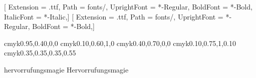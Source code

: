 \usepackage{fontspec}          %
\setmainfont{Inter_24pt}[
  Extension      = .ttf,
  Path           = fonts/,
  UprightFont    = *-Regular,
  BoldFont       = *-Bold,
  ItalicFont     = *-Italic,]
\newfontfamily{}[
  Extension      = .ttf,
  Path           = fonts/,
  UprightFont    = *-Regular,
  BoldFont       = *-Bold,]



\definecolor{bannmagie}         {cmyk}{0.95,0.40,0,0}      %
\definecolor{erkenntnismagie}   {cmyk}{0.10,0.60,1,0}       %
\definecolor{illusionsmagie}    {cmyk}{0.40,0.70,0,0}       %
\definecolor{verwandlungsmagie} {cmyk}{0.10,0.75,1,0.10}    %
\definecolor{nekromantie}       {cmyk}{0.35,0.35,0.35,0.55} %

\usepackage{fontawesome5}

\newcommand{\ishealing}{\faHeart}

\expandafter\def\csname school@hervorrufungsmagie@color\endcsname{hervorrufungsmagie}
\expandafter\def\csname school@hervorrufungsmagie@icon\endcsname{\faFire}
\expandafter\def\csname school@hervorrufungsmagie@name\endcsname{Hervorrufungsmagie}

